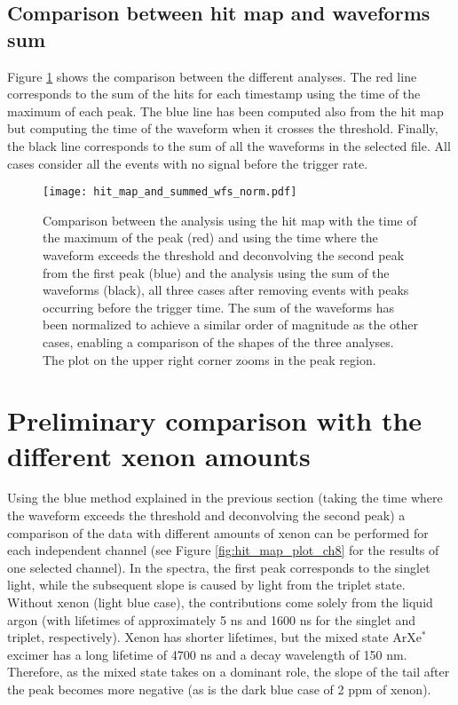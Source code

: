 \documentclass[11pt,a4paper,english,oneside, pdf]{article}
\begin{document}
	
	\subsection{Comparison between hit map and waveforms sum}
	
	Figure \ref{fig:hit_map_and_summed_wfs_norm} shows the comparison between the different analyses. The red line corresponds to the sum of the hits for each timestamp using the time of the maximum of each peak. The blue line has been computed also from the hit map but computing the time of the waveform when it crosses the threshold. Finally, the black line corresponds to the sum of all the waveforms in the selected file. All cases consider all the events with no signal before the trigger rate.
	
	\begin{figure}[!h]
		\begin{center}
			\texttt{[image: hit\_map\_and\_summed\_wfs\_norm.pdf]}
			\caption{Comparison between the analysis using the hit map with the time of the maximum of the peak (red) and using the time where the waveform exceeds the threshold and deconvolving the second peak from the first peak (blue) and the analysis using the sum of the waveforms (black), all three cases after removing events with peaks occurring before the trigger time. The sum of the waveforms has been normalized to achieve a similar order of magnitude as the other cases, enabling a comparison of the shapes of the three analyses. The plot on the upper right corner zooms in the peak region.}
			\label{fig:hit_map_and_summed_wfs_norm}
		\end{center}
	\end{figure}
	
	
	\clearpage
	
	\section{Preliminary comparison with the different xenon amounts}
	
	Using the blue method explained in the previous section (taking the time where the waveform exceeds the threshold and deconvolving the second peak) a comparison of the data with different amounts of xenon can be performed for each independent channel (see Figure \ref{fig:hit_map_plot_ch8} for the results of one selected channel). In the spectra, the first peak corresponds to the singlet light, while the subsequent slope is caused by light from the triplet state. Without xenon (light blue case), the contributions come solely from the liquid argon (with lifetimes of approximately 5 ns and 1600 ns for the singlet and triplet, respectively). Xenon has shorter lifetimes, but the mixed state ArXe$^*$ excimer has a long lifetime of 4700 ns and a decay wavelength of 150 nm. Therefore, as the mixed state takes on a dominant role, the slope of the tail after the peak becomes more negative (as is the dark blue case of 2 ppm of xenon).
	
\end{document}
